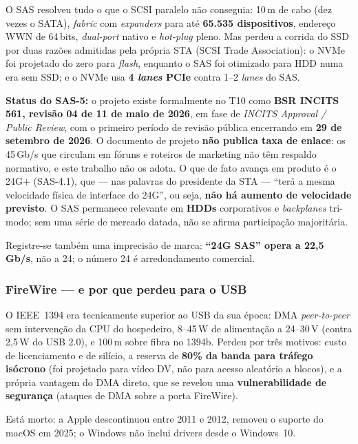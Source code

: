 \documentclass[11pt,a4paper]{article}
\begin{document}
O SAS resolveu tudo o que o SCSI paralelo não conseguia: 10\,m de cabo (dez vezes o SATA),
\emph{fabric} com \emph{expanders} para até \textbf{65.535 dispositivos}, endereço WWN de
64\,bits, \emph{dual-port} nativo e \emph{hot-plug} pleno. Mas perdeu a corrida do SSD por
duas razões admitidas pela própria STA (SCSI Trade Association): o NVMe foi projetado do
zero para \emph{flash}, enquanto o SAS foi otimizado para HDD numa era sem SSD; e o NVMe usa
\textbf{4 \emph{lanes} PCIe} contra 1--2 \emph{lanes} do SAS.

\textbf{Status do SAS-5:} o projeto existe formalmente no T10 como \textbf{BSR INCITS 561,
revisão 04 de 11 de maio de 2026}, em fase de \emph{INCITS Approval / Public Review}, com o
primeiro período de revisão pública encerrando em \textbf{29 de setembro de 2026}. O
documento de projeto \textbf{não publica taxa de enlace}: os 45\,Gb/s que circulam em fóruns
e roteiros de marketing não têm respaldo normativo, e este trabalho não os adota. O que de
fato avança em produto é o 24G$+$ (SAS-4.1), que --- nas palavras do presidente da STA ---
``terá a mesma velocidade física de interface do 24G'', ou seja, \textbf{não há aumento de
velocidade previsto}. O SAS permanece relevante em \textbf{HDDs} corporativos e
\emph{backplanes} tri-modo; sem uma série de mercado datada, não se afirma participação
majoritária.

Registre-se também uma imprecisão de marca: \textbf{``24G SAS'' opera a 22,5\,Gb/s}, não a
24; o número 24 é arredondamento comercial.

\subsubsection{FireWire --- e por que perdeu para o USB}

O IEEE~1394 era tecnicamente superior ao USB da sua época: DMA \emph{peer-to-peer} sem
intervenção da CPU do hospedeiro, 8--45\,W de alimentação a 24--30\,V (contra 2,5\,W do USB
2.0), e 100\,m sobre fibra no 1394b. Perdeu por três motivos: custo de licenciamento e de
silício, a reserva de \textbf{80\% da banda para tráfego isócrono} (foi projetado para vídeo
DV, não para acesso aleatório a blocos), e a própria vantagem do DMA direto, que se revelou
uma \textbf{vulnerabilidade de segurança} (ataques de DMA sobre a porta FireWire).

Está morto: a Apple descontinuou entre 2011 e 2012, removeu o suporte do macOS em 2025; o
Windows não inclui drivers desde o Windows~10.
\end{document}
